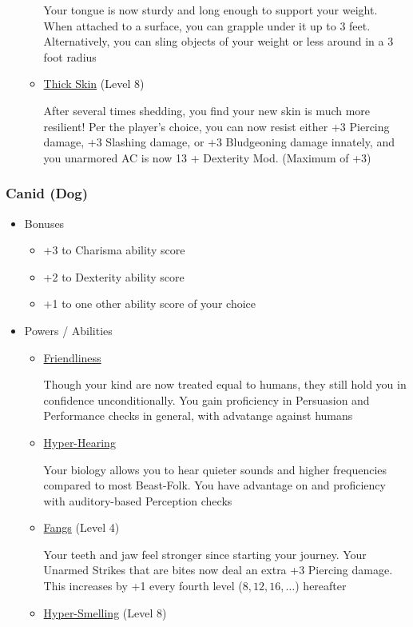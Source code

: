 \documentclass[12pt, landscape]{article}
\begin{document}
\begin{FlushLeft}
\begin{multicols}{2}
\begin{itemize}[wide]
\begin{itemize}
					Your tongue is now sturdy and long enough to support your weight. When attached to a surface, you can grapple under it up to 3 feet.
					Alternatively, you can sling objects of your weight or less around in a 3 foot radius
					\item \underline{Thick Skin} (Level 8)

					After several times shedding, you find your new skin is much more resilient!
					Per the player’s choice, you can now resist either +3 Piercing damage, +3 Slashing damage, or +3 Bludgeoning damage innately, and you unarmored AC is now 13 + Dexterity Mod. (Maximum of +3)
				\end{itemize}
			\end{itemize}
			\vfill \pagebreak

			\subsubsection{Canid (Dog)}
			\begin{itemize}[wide]
				\item Bonuses
				\begin{itemize}
					\item +3 to Charisma ability score
					\item +2 to Dexterity ability score
					\item +1 to one other ability score of your choice
				\end{itemize}
				\item Powers / Abilities
				\begin{itemize}
					\item \underline{Friendliness}

					Though your kind are now treated equal to humans, they still hold you in confidence unconditionally.
					You gain proficiency in Persuasion and Performance checks in general, with advatange against humans

					\item \underline{Hyper-Hearing}

					Your biology allows you to hear quieter sounds and higher frequencies compared to most Beast-Folk.
					You have advantage on and proficiency with auditory-based Perception checks

					\item \underline{Fangs} (Level 4)

					Your teeth and jaw feel stronger since starting your journey.
					Your Unarmed Strikes that are bites now deal an extra +3 Piercing damage. This increases by +1 every fourth level ($8, 12, 16, \dots$) hereafter
					\item \underline{Hyper-Smelling} (Level 8)


\end{itemize}
\end{itemize}
\end{multicols}
\end{FlushLeft}
\end{document}
